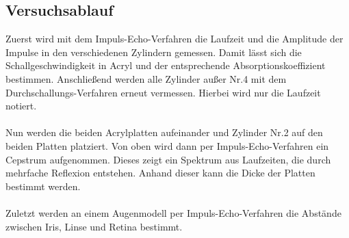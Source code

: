 \documentclass[
  bibliography=totoc,     %
  captions=tableheading,  %
  titlepage=firstiscover, %
]{scrartcl}
\begin{document}
\subsection{Versuchsablauf}
\label{sec:ablauf}
Zuerst wird mit dem Impuls-Echo-Verfahren die Laufzeit und die Amplitude der
Impulse in den verschiedenen Zylindern gemessen. Damit lässt sich die
Schallgeschwindigkeit in Acryl und der entsprechende Absorptionskoeffizient
bestimmen.
Anschließend werden alle Zylinder außer Nr.4 mit dem Durchschallungs-Verfahren
erneut vermessen. Hierbei wird nur die Laufzeit notiert.\\
\\
\noindent
Nun werden die beiden Acrylplatten aufeinander und Zylinder Nr.2 auf den beiden
Platten platziert. Von oben wird dann per Impuls-Echo-Verfahren ein Cepstrum
aufgenommen. Dieses zeigt ein Spektrum aus Laufzeiten, die durch mehrfache
Reflexion entstehen. Anhand dieser kann die Dicke der Platten bestimmt werden.\\
\\
\noindent
Zuletzt werden an einem Augenmodell per Impuls-Echo-Verfahren die Abstände
zwischen Iris, Linse und Retina bestimmt.
\clearpage
\end{document}
